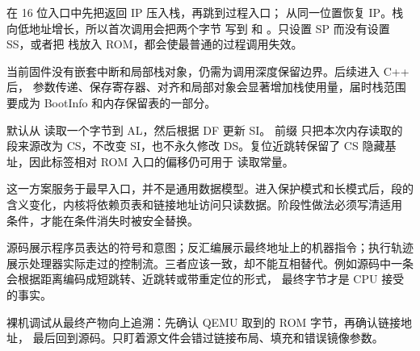  在 16 位入口中先把返回 IP 压入栈，再跳到过程入口；
 从同一位置恢复 IP。栈向低地址增长，所以首次调用会把两个字节
写到  和 。只设置 SP 而没有设置 SS，或者把
栈放入 ROM，都会使最普通的过程调用失效。

当前固件没有嵌套中断和局部栈对象，仍需为调用深度保留边界。后续进入 C++ 后，
参数传递、保存寄存器、对齐和局部对象会显著增加栈使用量，届时栈范围要成为
BootInfo 和内存保留表的一部分。

 默认从  读取一个字节到 AL，然后根据 DF 更新 SI。
前缀  只把本次内存读取的段来源改为 CS，不改变 SI，也不永久修改
DS。复位近跳转保留了 CS 隐藏基址，因此标签相对 ROM 入口的偏移仍可用于
读取常量。

这一方案服务于最早入口，并不是通用数据模型。进入保护模式和长模式后，段的
含义变化，内核将依赖页表和链接地址访问只读数据。阶段性做法必须写清适用
条件，才能在条件消失时被安全替换。

源码展示程序员表达的符号和意图；反汇编展示最终地址上的机器指令；执行轨迹
展示处理器实际走过的控制流。三者应该一致，却不能互相替代。例如源码中一条
 会根据距离编码成短跳转、近跳转或带重定位的形式，
最终字节才是 CPU 接受的事实。

裸机调试从最终产物向上追溯：先确认 QEMU 取到的 ROM 字节，再确认链接地址，
最后回到源码。只盯着源文件会错过链接布局、填充和错误镜像参数。
